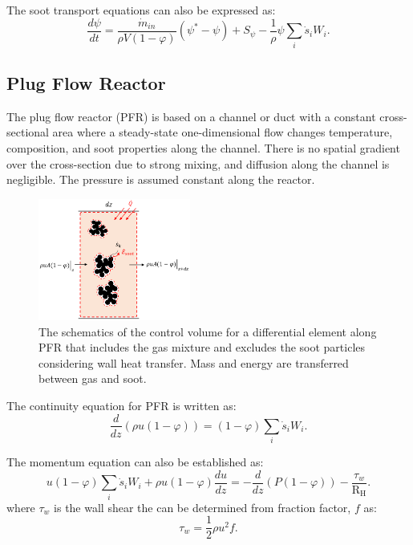 The soot transport equations can also be expressed as:
\begin{equation}
	\frac{d\psi}{dt}
	=
	\frac{{\dot{m}}_{in}}{\rho V
	\left(1-\varphi\right)}
	\left(\psi^\ast-\psi\right)
	+
	S_{\psi}
	-\frac{1}{\rho}\psi\sum_{i}{{\dot{s}}_i W_i}
	\label{eqn:sootpsr}.
\end{equation}

\subsection{Plug Flow Reactor}
The plug flow reactor (PFR) is based on a channel or duct with a constant cross-sectional area where a steady-state one-dimensional flow changes temperature, composition, and soot properties along the channel. There is no spatial gradient over the cross-section due to strong mixing, and  diffusion along the channel is negligible. The pressure is assumed constant along the reactor.
\begin{figure}[!htbp]
	\centering
	\includegraphics[height=40mm, ]{Figures/Theory/PFR.pdf}
	\caption{The schematics of the control volume for a differential element along PFR that includes the gas mixture and excludes the soot particles considering wall heat transfer. Mass and energy are transferred between gas and soot.}
	\label{fig:pfrcv}
\end{figure}

 

The continuity equation for PFR is written as:
\begin{equation}
	\frac{d}{dz}(\rho u(1-\varphi)) =(1-\varphi) \sum_i \dot s_i W_i
	\label{eqn:contpfr}.
\end{equation}

The momentum equation can also be established as:
\begin{equation}
	u (1-\varphi) \sum_i \dot s_i W_i + \rho u (1-\varphi) \frac{du}{dz}
	=-\frac{d}{dz}(P(1-\varphi))-\frac{\tau_{w}}{\mathrm{R_H}} 
	\label{eqn:momenpfr}.
\end{equation}
\noindent where $\tau_w$ is the wall shear the can be determined from fraction factor, $f$ as:
\begin{equation}
	\tau_w = \frac{1}{2}\rho u^2 f 
	\label{eqn:wallshearpfr}.
\end{equation}

